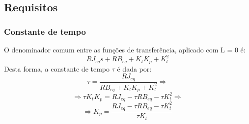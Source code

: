 \documentclass{article}[twocolumn]
\begin{document}
	\subsection{Requisitos}
	\subsubsection{Constante de tempo}
	O denominador comum entre as fun\c{c}\~oes de transfer\^encia, aplicado com L = 0 \'e:
	\begin{equation}
		RJ_{eq}s + RB_{eq} + K_tK_p + K_t^2
		\nonumber
	\end{equation}
	Desta forma, a constante de tempo $\tau$ \'e dada por:
	\begin{equation}
		\tau = \frac{RJ_{eq}}{RB_{eq} + K_tK_p + K_t^2}
		\Rightarrow
		\nonumber
	\end{equation}
	\begin{equation}
		\Rightarrow \tau K_tK_p = RJ_{eq} - \tau RB_{eq} - \tau K_t^2
		\Rightarrow
		\nonumber
	\end{equation}
	\begin{equation}
		\Rightarrow K_p = \frac{RJ_{eq} - \tau RB_{eq} - \tau K_t^2}{\tau K_t}
		\label{eq:kp_pff}
	\end{equation}
\end{document}
